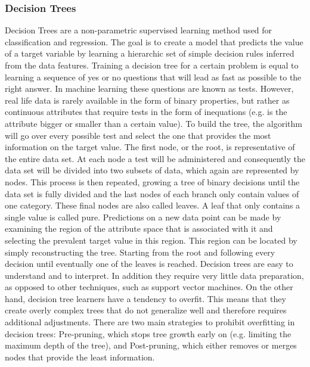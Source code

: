 \subsubsection{Decision Trees}
Decision Trees are a non-parametric supervised learning method used for classification and regression. The goal is to create a model that predicts the value of a target variable by learning a hierarchic set of simple decision rules inferred from the data features. Training a decision tree for a certain problem is equal to learning a sequence of yes or no questions that will lead as fast as possible to the right answer. In machine learning these questions are known as tests. However, real life data is rarely available in the form of binary properties, but rather as continuous attributes that require tests in the form of inequations (e.g. is the attribute bigger or smaller than a certain value). To build the tree, the algorithm will go over every possible test and select the one that provides the most information on the target value. The first node, or the root, is representative of the entire data set. At each node a test will be administered and consequently the data set will be divided into two subsets of data, which again are represented by nodes. This process is then repeated, growing a tree of binary decisions until the data set is fully divided and the last nodes of each branch only contain values of one category. These final nodes are also called leaves. A leaf that only contains a single value is called pure. Predictions on a new data point can be made by examining the region of the attribute space that is associated with it and selecting the prevalent target value in this region. This region can be located by simply reconstructing the tree. Starting from the root and following every decision until eventually one of the leaves is reached.
Decision trees are easy to understand and to interpret. In addition they require  very little data preparation, as opposed to other techniques, such as support vector machines. On the other hand, decision tree learners have a tendency to overfit. This means that they create overly complex trees that do not generalize well and therefore requires additional adjustments. There are two main strategies to prohibit overfitting in decision trees: Pre-pruning, which stops tree growth early on (e.g. limiting the maximum depth of the tree), and Post-pruning, which either removes or merges nodes that provide the least information.

